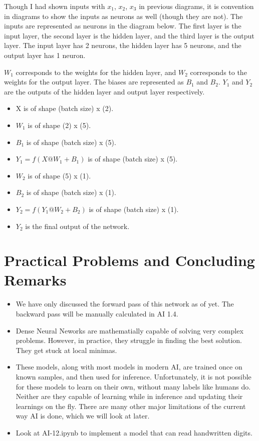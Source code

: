 \documentclass[12pt,a4paper]{article}
\begin{document}
Though I had shown inputs with $x_1$, $x_2$, $x_3$ in previous diagrams, it is convention in diagrams to show the inputs as neurons as well (though they are not). The inputs are represented as neurons in the diagram below. The first layer is the input layer, the second layer is the hidden layer, and the third layer is the output layer. The input layer has 2 neurons, the hidden layer has 5 neurons, and the output layer has 1 neuron.

$W_1$ corresponds to the weights for the hidden layer, and $W_2$ corresponds to the weights for the output layer. The biases are represented as $B_1$ and $B_2$. $Y_1$ and $Y_2$ are the outputs of the hidden layer and output layer respectively. 
\begin{itemize}
    \item X is of shape (batch size) x (2).
    \item $W_1$ is of shape (2) x (5).
    \item $B_1$ is of shape (batch size) x (5).
    \item $Y_1 = f(X @ W_1 + B_1)$ is of shape (batch size) x (5).
    \item $W_2$ is of shape (5) x (1).
    \item $B_2$ is of shape (batch size) x (1).
    \item $Y_2 = f(Y_1 @ W_2 + B_2)$ is of shape (batch size) x (1).
    \item $Y_2$ is the final output of the network.
\end{itemize}

\section{Practical Problems and Concluding Remarks}
\begin{itemize}
    \item We have only discussed the forward pass of this network as of yet. The backward pass will be manually calculated in AI 1.4.
    \item Dense Neural Neworks are mathematially capable of solving very complex problems. However, in practice, they struggle in finding the best solution. They get stuck at local minimas. 
    \item These models, along with most models in modern AI, are trained once on known samples, and then used for inference. Unfortunately, it is not possible for these models to learn on their own, without many labels like humans do. Neither are they capable of learning while in inference and updating their learnings on the fly. There are many other major limitations of the current way AI is done, which we will look at later.
    \item Look at AI-12.ipynb to implement a model that can read handwritten digits. 
\end{itemize}
\end{document}
